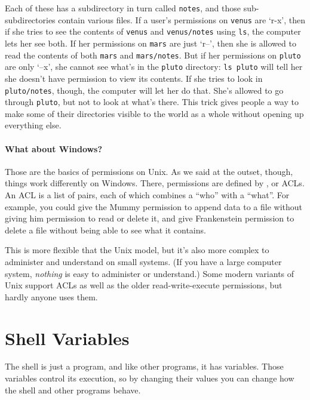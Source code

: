 \documentclass{book}
\begin{document}

Each of these has a subdirectory in turn called \texttt{notes}, and
those sub-subdirectories contain various files. If a user's permissions
on \texttt{venus} are `r-x', then if she tries to see the contents of
\texttt{venus} and \texttt{venus/notes} using \texttt{ls}, the computer
lets her see both. If her permissions on \texttt{mars} are just `r--',
then she is allowed to read the contents of both \texttt{mars} and
\texttt{mars/notes}. But if her permissions on \texttt{pluto} are only
`--x', she cannot see what's in the \texttt{pluto} directory:
\texttt{ls pluto} will tell her she doesn't have permission to view its
contents. If she tries to look in \texttt{pluto/notes}, though, the
computer will let her do that. She's allowed to go through
\texttt{pluto}, but not to look at what's there. This trick gives people
a way to make some of their directories visible to the world as a whole
without opening up everything else.

\mbox{}\paragraph{What about Windows?}

Those are the basics of permissions on Unix. As we said at the outset,
though, things work differently on Windows. There, permissions are
defined by , or
ACLs. An ACL is a list of pairs, each of which combines a ``who'' with a
``what''. For example, you could give the Mummy permission to append
data to a file without giving him permission to read or delete it, and
give Frankenstein permission to delete a file without being able to see
what it contains.

This is more flexible that the Unix model, but it's also more complex to
administer and understand on small systems. (If you have a large
computer system, \emph{nothing} is easy to administer or understand.)
Some modern variants of Unix support ACLs as well as the older
read-write-execute permissions, but hardly anyone uses them.

\section{Shell Variables}

The shell is just a program, and like other programs, it has variables.
Those variables control its execution, so by changing their values you
can change how the shell and other programs behave.
\end{document}
